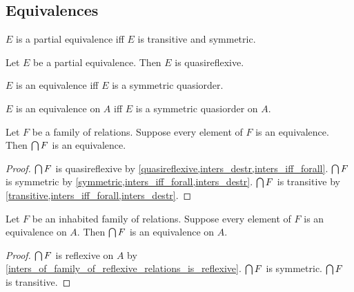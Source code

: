 





\subsection{Equivalences}

\begin{abbreviation}\label{partialequivalence}
    $E$ is a partial equivalence iff
    $E$ is transitive and symmetric.
\end{abbreviation}

\begin{proposition}\label{partialequivalence_is_quasireflexive}
    Let $E$ be a partial equivalence.
    Then $E$ is quasireflexive.
\end{proposition}

\begin{abbreviation}\label{equivalence}
    $E$ is an equivalence iff
    $E$ is a symmetric quasiorder.
\end{abbreviation}

\begin{abbreviation}\label{equivalence_on}
    $E$ is an equivalence on $A$ iff
    $E$ is a symmetric quasiorder on $A$.
\end{abbreviation}

\begin{proposition}\label{inters_of_family_of_equivalences_is_equivalence}
    Let $F$ be a family of relations.
    Suppose every element of $F$ is an equivalence.
    Then $\bigcap F$ is an equivalence.
\end{proposition}
\begin{proof}
    $\bigcap F$ is quasireflexive by \cref{quasireflexive,inters_destr,inters_iff_forall}.
    $\bigcap F$ is symmetric by \cref{symmetric,inters_iff_forall,inters_destr}.
    $\bigcap F$ is transitive by \cref{transitive,inters_iff_forall,inters_destr}.
\end{proof}

\begin{proposition}\label{inters_of_family_of_equivalences_on_a_set_is_equivalence_on_that_set}
    Let $F$ be an inhabited family of relations.
    Suppose every element of $F$ is an equivalence on $A$.
    Then $\bigcap F$ is an equivalence on $A$.
\end{proposition}
\begin{proof}
    $\bigcap F$ is reflexive on $A$ by \cref{inters_of_family_of_reflexive_relations_is_reflexive}.
    $\bigcap F$ is symmetric.
    $\bigcap F$ is transitive.
\end{proof}


